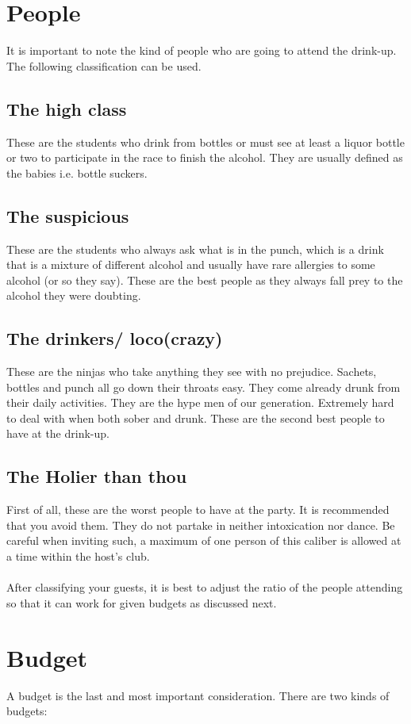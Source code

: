 \documentclass{article}
\begin{document}
\section{People}
It is important to note the kind of people who are going to attend the drink-up. The following classification can be used.
\subsection{The high class}
These are the students who drink from bottles or must see at least a liquor bottle or two to participate in the race to finish the alcohol. They are usually defined as the babies i.e. bottle suckers.
\subsection{The suspicious}
These are the students who always ask what is in the punch, which is a drink that is a mixture of different alcohol and usually have rare allergies to some alcohol (or so they say). These are the best people as they always fall prey to the alcohol they were doubting.
\subsection{The drinkers/ loco(crazy)}
These are the ninjas who take anything they see with no prejudice. Sachets, bottles and punch all go down their throats easy. They come already drunk from their daily activities. They are the hype men of our generation. Extremely hard to deal with when both sober and drunk. These are the second best people to have at the drink-up.
\subsection{The Holier than thou}
First of all, these are the worst people to have at the party. It is recommended that you avoid them. They do not partake in neither intoxication nor dance. Be careful when inviting such, a maximum of one person of this caliber is allowed at a time within the host’s club.
\paragraph{}
After classifying your guests, it is best to adjust the ratio of the people attending so that it can work for given budgets as discussed next.

\section{Budget}
A budget is the last and most important consideration. There are two kinds of budgets:
\end{document}
